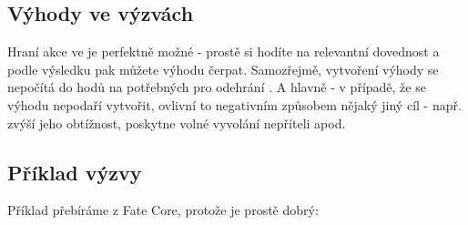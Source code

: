 \subsection{Výhody ve výzvách}
\label{sec:výhody-výzvy}

Hraní akce  ve  je perfektně možné - prostě si hodíte na relevantní dovednost a podle výsledku pak můžete výhodu čerpat. Samozřejmě, vytvoření výhody se nepočítá do hodů na  potřebných pro odehrání . A hlavně - v případě, že se výhodu nepodaří vytvořit, ovlivní to negativním způsobem nějaký jiný cíl - např. zvýší jeho obtížnost, poskytne volné vyvolání nepříteli apod.

\subsection{Příklad výzvy}
\label{sec:příklad-výzvy}

Příklad  přebíráme z Fate Core, protože je prostě dobrý:

